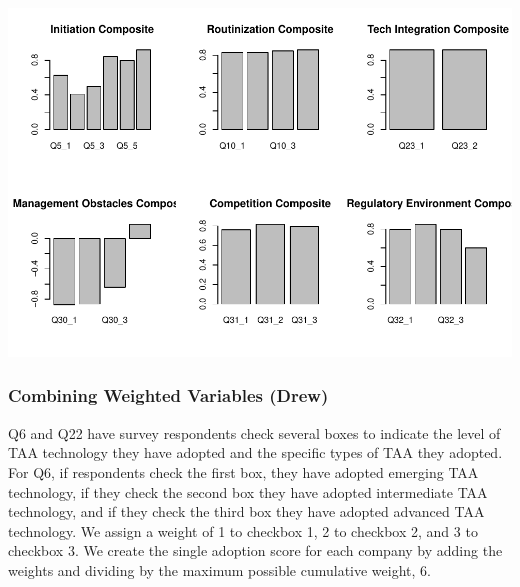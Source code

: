 \documentclass[
]{article}
\newenvironment{Shaded}{\begin{snugshade}}{\end{snugshade}}
\newcommand{\CommentTok}[1]{\textcolor[rgb]{0.56,0.35,0.01}{\textit{#1}}}
\newcommand{\KeywordTok}[1]{\textcolor[rgb]{0.13,0.29,0.53}{\textbf{#1}}}
\newcommand{\NormalTok}[1]{#1}
\newcommand{\OperatorTok}[1]{\textcolor[rgb]{0.81,0.36,0.00}{\textbf{#1}}}
\newcommand{\StringTok}[1]{\textcolor[rgb]{0.31,0.60,0.02}{#1}}
\begin{document}
\includegraphics{markdown_report_files/figure-latex/unnamed-chunk-5-1.pdf}

\begin{Shaded}
\end{Shaded}

\hypertarget{combining-weighted-variables-drew}{%
\subsubsection{Combining Weighted Variables
(Drew)}\label{combining-weighted-variables-drew}}

Q6 and Q22 have survey respondents check several boxes to indicate the
level of TAA technology they have adopted and the specific types of TAA
they adopted. For Q6, if respondents check the first box, they have
adopted emerging TAA technology, if they check the second box they have
adopted intermediate TAA technology, and if they check the third box
they have adopted advanced TAA technology. We assign a weight of 1 to
checkbox 1, 2 to checkbox 2, and 3 to checkbox 3. We create the single
adoption score for each company by adding the weights and dividing by
the maximum possible cumulative weight, 6.
\end{document}
